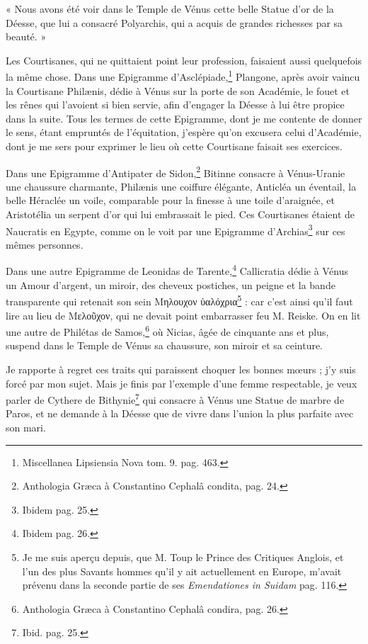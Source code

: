 \documentclass[a4paper, 11pt, oneside, polutonikogreek, french]{article}
\begin{document}
« Nous avons été voir dans le Temple de Vénus cette belle Statue d'or de la Déesse, que lui a consacré Polyarchis, qui a acquis de grandes richesses par sa beauté. »

Les Courtisanes, qui ne quittaient point leur profession, faisaient aussi quelquefois la même chose. Dans une Epigramme d'Asclépiade,\footnote{Miscellanea Lipsiensia Nova tom. 9. pag. 463.} Plangone, après avoir vaincu la Courtisane Philænis, dédie à Vénus sur la porte de son Académie, le fouet et les rênes qui l'avoient si bien servie, afin d'engager la Déesse à lui être propice dans la suite. Tous les termes de cette Epigramme, dont je me contente de donner le sens, étant empruntés de l'équitation, j'espère qu'on excusera celui d'Académie, dont je me sers pour exprimer le lieu où cette Courtisane faisait ses exercices.

Dans une Epigramme d'Antipater de Sidon,\footnote{Anthologia Græca à Constantino Cephalâ condita, pag. 24.} Bitinne consacre à Vénus-Uranie une chaussure charmante, Philænis une coiffure élégante, Anticléa un éventail, la belle Héraclée un voile, comparable pour la finesse à une toile d'araignée, et Aristotélia un serpent d'or qui lui embrassait le pied. Ces Courtisanes étaient de Naucratis en Egypte, comme on le voit par une Epigramme d'Archias\footnote{Ibidem pag. 25.} sur ces mêmes personnes.

Dans une autre Epigramme de Leonidas de Tarente,\footnote{Ibidem pag. 26.} Callicratia dédie à Vénus un Amour d'argent, un miroir, des cheveux postiches, un peigne et la bande transparente qui retenait son sein Μηλουχον ὑαλόχρια\footnote{Je me suis aperçu depuis, que M. Toup le Prince des Critiques Anglois, et l'un des plus Savants hommes qu'il y ait actuellement en Europe, m'avait prévenu dans la seconde partie de ses \emph{Emendationes in Suidam} pag. 116.} : car c'est ainsi qu'il faut lire au lieu de Μελοῦχον, qui ne devait point embarrasser feu M. Reiske. On en lit une autre de Philétas de Samos,\footnote{Anthologia Græca à Constantino Cephalâ condira, pag. 26.} où Nicias, âgée de cinquante ans et plus, suspend dans le Temple de Vénus sa chaussure, son miroir et sa ceinture.

Je rapporte à regret ces traits qui paraissent choquer les bonnes mœurs ; j'y suis forcé par mon sujet. Mais je finis par l'exemple d'une femme respectable, je veux parler de Cythere de Bithynie\footnote{Ibid. pag. 25.} qui consacre à Vénus une Statue de marbre de Paros, et ne demande à la Déesse que de vivre dans l'union la plus parfaite avec son mari.
\end{document}
